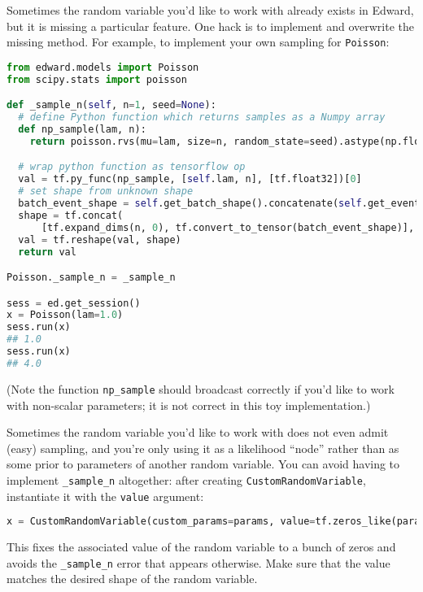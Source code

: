 Sometimes the random variable you'd like to work with already exists
in Edward, but it is missing a particular feature. One hack is to
implement and overwrite the missing method. For example, to implement
your own sampling for \texttt{Poisson}:

\begin{lstlisting}[language=Python]
from edward.models import Poisson
from scipy.stats import poisson

def _sample_n(self, n=1, seed=None):
  # define Python function which returns samples as a Numpy array
  def np_sample(lam, n):
    return poisson.rvs(mu=lam, size=n, random_state=seed).astype(np.float32)

  # wrap python function as tensorflow op
  val = tf.py_func(np_sample, [self.lam, n], [tf.float32])[0]
  # set shape from unknown shape
  batch_event_shape = self.get_batch_shape().concatenate(self.get_event_shape())
  shape = tf.concat(
      [tf.expand_dims(n, 0), tf.convert_to_tensor(batch_event_shape)], 0)
  val = tf.reshape(val, shape)
  return val

Poisson._sample_n = _sample_n

sess = ed.get_session()
x = Poisson(lam=1.0)
sess.run(x)
## 1.0
sess.run(x)
## 4.0
\end{lstlisting}

(Note the function \texttt{np_sample} should broadcast correctly if
you'd like to work with non-scalar parameters; it is not correct in
this toy implementation.)

Sometimes the random variable you'd like to work with does not even
admit (easy) sampling, and you're only using it as a likelihood ``node'' rather
than as some prior to parameters of another random variable.
You can avoid having to implement \texttt{_sample_n} altogether:
after creating \texttt{CustomRandomVariable}, instantiate it with the
\texttt{value} argument:

\begin{lstlisting}[language=Python]
x = CustomRandomVariable(custom_params=params, value=tf.zeros_like(params))
\end{lstlisting}

This fixes the associated value of the random variable to a bunch of
zeros and avoids the \texttt{_sample_n} error that appears otherwise.
Make sure that the value matches the desired shape of the random
variable.

